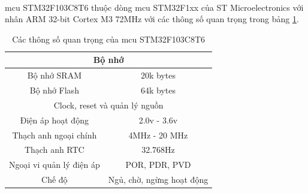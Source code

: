 \paragraph{}
\Acrlong{mcu} STM32F103C8T6 thuộc dòng \acrshort{mcu} STM32F1xx của ST Microelectronics với nhân ARM 32-bit Cortex M3 72MHz với các thông số quan trọng trong bảng \ref{tab:specs}.
\begin{table}[H]
    \centering
    \caption{Các thông số quan trọng của \acrshort{mcu} STM32F103C8T6}
    \begin{tabular}{|c|c|}
        \hline
        \multicolumn{2}{|c|}{Bộ nhớ} \\
        \hline
        Bộ nhớ SRAM & 20k bytes \\
        \hline
        Bộ nhớ Flash & 64k bytes \\
        \hline
        \hline
        \multicolumn{2}{|c|}{Clock, reset và quản lý nguồn} \\
        \hline
        Điện áp hoạt động & 2.0v - 3.6v \\
        \hline
        Thạch anh ngoại chính & 4MHz - 20 MHz \\
        \hline
        Thạch anh RTC & 32.768Hz \\
        \hline
        Ngoại vi quản lý điện áp & POR, PDR, PVD \\
        \hline
        Chế độ & Ngủ, chờ, ngừng hoạt động \\
        \hline
         
    \end{tabular}
    \label{tab:specs}
\end{table}

